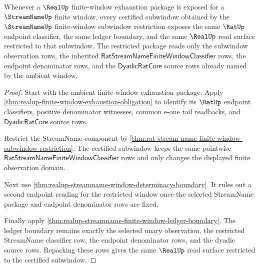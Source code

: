 \begin{theorem}
\label{thm:realup-finite-window-exhaustion-subwindow-closure}
Whenever a $\RealUp$ finite-window exhaustion package is exposed for a
$\StreamNameUp$ finite window, every certified subwindow obtained by the
$\StreamNameUp$ finite-window subwindow restriction exposes the same $\RatUp$
endpoint classifier, the same ledger boundary, and the same $\RealUp$ read
surface restricted to that subwindow. The restricted package reads only the
subwindow observation rows, the inherited
$\mathsf{RatStreamNameFiniteWindowClassifier}$ rows, the endpoint denominator
rows, and the $\mathsf{DyadicRatCore}$ source rows already named by the ambient
window.
\end{theorem}
\begin{proof}
Start with the ambient finite-window exhaustion package. Apply
\autoref{thm:realup-finite-window-exhaustion-obligation} to identify its
$\RatUp$ endpoint classifiers, positive denominator witnesses, common e-one
tail readbacks, and $\mathsf{DyadicRatCore}$ source rows.

Restrict the StreamName component by
\autoref{thm:rat-stream-name-finite-window-subwindow-restriction}. The certified
subwindow keeps the same pointwise
$\mathsf{RatStreamNameFiniteWindowClassifier}$ rows and only changes the
displayed finite observation domain.

Next use \autoref{thm:realup-streamname-window-determinacy-boundary}. It rules
out a second endpoint reading for the restricted window once the selected
StreamName package and endpoint denominator rows are fixed.

Finally apply
\autoref{thm:realup-streamname-finite-window-ledger-boundary}. The ledger
boundary remains exactly the selected unary observation, the restricted
StreamName classifier row, the endpoint denominator rows, and the dyadic source
rows. Repacking these rows gives the same $\RealUp$ read surface restricted to
the certified subwindow.
\end{proof}

